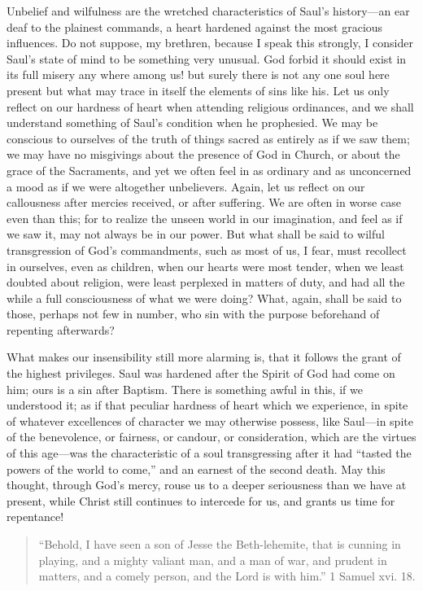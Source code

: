 Unbelief and wilfulness are the wretched characteristics of Saul's
history—an ear deaf to the plainest commands, a heart hardened
against the most gracious influences. Do not suppose, my brethren,
because I speak this strongly, I consider Saul's state of mind to be
something very unusual. God forbid it should exist in its full misery
any where among us! but surely there is not any one soul here present
but what may trace in itself the elements of sins like his\emph{.} Let
us only reflect on our hardness of heart when attending religious
ordinances, and we shall understand something of Saul's condition
when he prophesied. We may be conscious to ourselves of the truth of
things sacred as entirely as if we saw them; we may have no misgivings
about the presence of God in Church, or about the grace of the
Sacraments, and yet we often feel in as ordinary and as unconcerned a
mood as if we were altogether unbelievers. Again, let us reflect on
our callousness after mercies received, or after suffering. We are
often in worse case even than this; for to realize the unseen world in
our imagination, and feel as if we saw it, may not always be in our
power. But what shall be said to wilful transgression of God's
commandments, such as most of us, I fear, must recollect in ourselves,
even as children, when our hearts were most tender, when we least
doubted about religion, were least perplexed in matters of duty, and
had all the while a full consciousness of what we were doing? What,
again, shall be said to those, perhaps not few in number, who sin with
the purpose beforehand of repenting afterwards?

What makes our insensibility still more alarming is, that it
follows the grant of the highest privileges. Saul was hardened after
the Spirit of God had come on him; ours is a sin after Baptism. There
is something awful in this, if we understood it; as if that peculiar
hardness of heart which we experience, in spite of whatever
excellences of character we may otherwise possess, like Saul—in
spite of the benevolence, or fairness, or candour, or consideration,
which are the virtues of this age—was the characteristic of a soul
transgressing after it had ``tasted the powers of the world to
come,'' and an earnest of the second death. May this thought,
through God's mercy, rouse us to a deeper seriousness than we have
at present, while Christ still continues to intercede for us, and
grants us time for repentance!


\begin{quote}

``Behold, I have seen a son of Jesse the Beth-lehemite, that
is cunning in playing, and a mighty valiant man, and a man of war,
and prudent in matters, and a comely person, and the Lord is with
him.'' 1 Samuel xvi. 18.

\end{quote}

